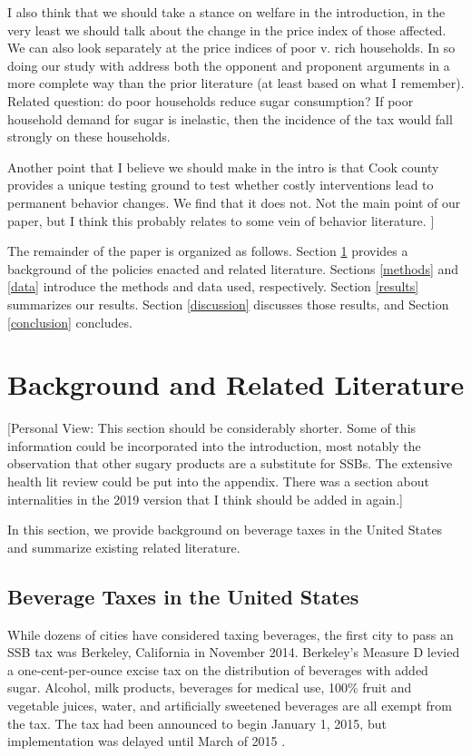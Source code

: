 \documentclass[12pt]{article}
\begin{document}
I also think that we should take a stance on welfare in the introduction, in the very least we should talk about the change in the price index of those affected. We can also look separately at the price indices of poor v. rich households. In so doing our study with address both the opponent and proponent arguments in a more complete way than the prior literature (at least based on what I remember). Related question: do poor households reduce sugar consumption? If poor household demand for sugar is inelastic, then the incidence of the tax would fall strongly on these households.

Another point that I believe we should make in the intro is that Cook county provides a unique testing ground to test whether costly interventions lead to permanent behavior changes. We find that it does not. Not the main point of our paper, but I think this probably relates to some vein of behavior literature. ]

The remainder of the paper is organized as follows. Section \ref{background} provides a background of the policies enacted and related literature. Sections \ref{methods} and \ref{data} introduce the methods and data used, respectively. Section \ref{results} summarizes our results. Section \ref{discussion} discusses those results, and Section \ref{conclusion} concludes.

\section{Background and Related Literature} \label{background}

[Personal View: This section should be considerably shorter. Some of this information could be incorporated into the introduction, most notably the observation that other sugary products are a substitute for SSBs. The extensive health lit review could be put into the appendix. There was a section about internalities in the 2019 version that I think should be added in again.]

In this section, we provide background on beverage taxes in the United States and summarize existing related literature.

\subsection{Beverage Taxes in the United States}

While dozens of cities have considered taxing beverages, the first city to pass an SSB tax was Berkeley, California in November 2014. Berkeley's Measure D levied a one-cent-per-ounce excise tax on the distribution of beverages with added sugar. Alcohol, milk products, beverages for medical use, 100\% fruit and vegetable juices, water, and artificially sweetened beverages are all exempt from the tax. The tax had been announced to begin January 1, 2015, but implementation was delayed until March of 2015 \parencite{falbe2015higher}.
\end{document}
